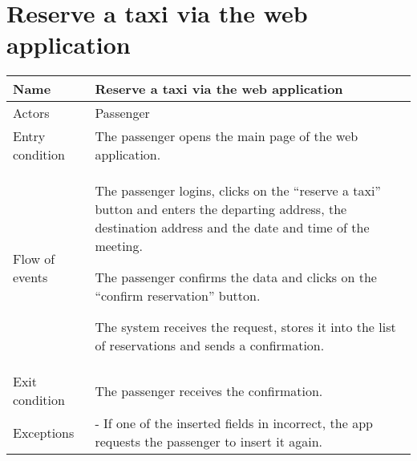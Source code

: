 \section{Reserve a taxi via the web application}
\begin{center}
\begin{longtable}{|l| p{9cm}|}
\hline
Name &
Reserve a taxi via the web application \\
\hline
Actors &
Passenger \\
\hline
Entry condition & 
The passenger opens the main page of the web application. \\
\hline
Flow of events & 
The passenger logins, clicks on the “reserve a taxi” button and enters the departing address, the destination address and the date and time of the meeting.

The passenger confirms the data and clicks on the “confirm reservation” button.

The system receives the request, stores it into the list of reservations and sends a confirmation. \\
\hline
Exit condition &
The passenger receives the confirmation. \\
\hline
Exceptions &
- If one of the inserted fields in incorrect, the app requests the passenger to insert it again. \\
\hline
\end{longtable}
\end{center}


